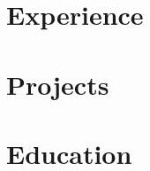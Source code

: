 \documentclass[letter,10pt]{article}
\begin{document}


\section{Experience}


%


\section{Projects}


\section{Education}


%
\vfill{}

\end{document}
